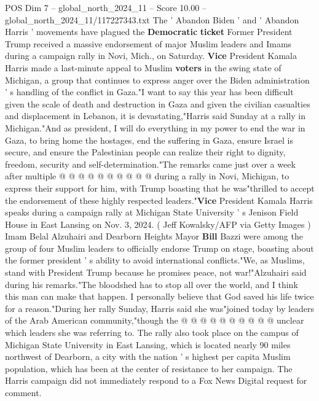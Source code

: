 \begin{textsample}{POS Dim 7 – global\_north\_2024\_11 – Score 10.00 – global\_north\_2024\_11/117227343.txt}  \label{ex:f7_pos_118}
The ' Abandon Biden ' and ' Abandon Harris ' movements have plagued the \textbf{Democratic} \textbf{ticket} Former President Trump received a massive endorsement of major Muslim leaders and Imams during a campaign rally in Novi, Mich., on Saturday. \textbf{Vice} President Kamala Harris made a last-minute appeal to Muslim \textbf{voters} in the swing state of Michigan, a group that continues to express anger over the Biden administration ' s handling of the conflict in Gaza."I want to say this year has been difficult given the scale of death and destruction in Gaza and given the civilian casualties and displacement in Lebanon, it is devastating,"Harris said Sunday at a rally in Michigan."And as president, I will do everything in my power to end the war in Gaza, to bring home the hostages, end the suffering in Gaza, ensure Israel is secure, and ensure the Palestinian people can realize their right to dignity, freedom, security and self-determination."The remarks came just over a week after multiple @ @ @ @ @ @ @ @ @ @ during a rally in Novi, Michigan, to express their support for him, with Trump boasting that he was"thrilled to accept the endorsement of these highly respected leaders."\textbf{Vice} President Kamala Harris speaks during a campaign rally at Michigan State University ' s Jenison Field House in East Lansing on Nov. 3, 2024. ( Jeff Kowalsky/AFP via Getty Images ) Imam Belal Alzuhairi and Dearborn Heights Mayor \textbf{Bill} Bazzi were among the group of four Muslim leaders to officially endorse Trump on stage, boasting about the former president ' s ability to avoid international conflicts."We, as Muslims, stand with President Trump because he promises peace, not war!"Alzuhairi said during his remarks."The bloodshed has to stop all over the world, and I think this man can make that happen.
I personally believe that God saved his life twice for a reason."During her rally Sunday, Harris said she was"joined today by leaders of the Arab American community,"though the @ @ @ @ @ @ @ @ @ @ unclear which leaders she was referring to.
The rally also took place on the campus of Michigan State University in East Lansing, which is located nearly 90 miles northwest of Dearborn, a city with the nation ' s highest per capita Muslim population, which has been at the center of resistance to her campaign.
The Harris campaign did not immediately respond to a Fox News Digital request for comment.

\end{textsample}
